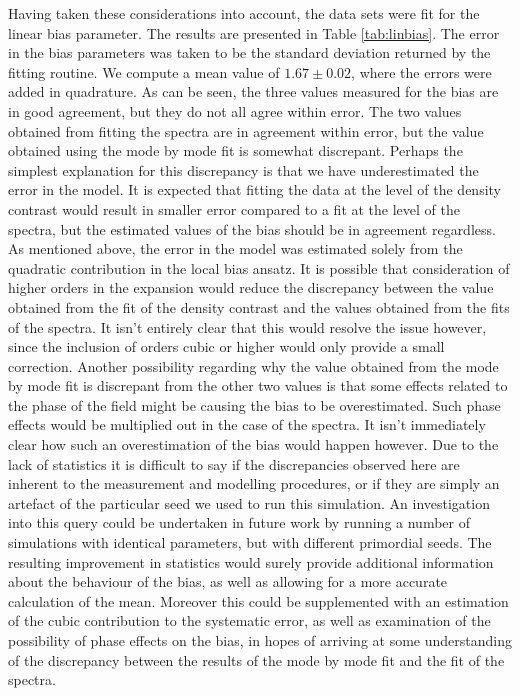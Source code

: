 \documentclass[10pt,letterpaper,final]{iopart}
\numberwithin{equation}{subsection}
\begin{document}
Having taken these considerations into account, the data sets were fit for the linear bias parameter. The results are presented in Table \ref{tab:linbias}. The error in the bias parameters was taken to be the standard deviation returned by the fitting routine.  We compute a mean value of $1.67 \pm 0.02$, where the errors were added in quadrature. As can be seen, the three values measured for the bias are in good agreement, but they do not all agree within error. The two values obtained from fitting the spectra are in agreement within error, but the value obtained using the mode by mode fit is somewhat discrepant. Perhaps the simplest explanation for this discrepancy is that we have underestimated the error in the model. It is expected that fitting the data at the level of the density contrast would result in smaller error compared to a fit at the level of the spectra, but the estimated values of the bias should be in agreement regardless. As mentioned above, the error in the model was estimated solely from the quadratic contribution in the local bias ansatz. It is possible that consideration of higher orders in the expansion would reduce the discrepancy between the value obtained from the fit of the density contrast and the values obtained from the fits of the spectra. It isn't entirely clear that this would resolve the issue however, since the inclusion of orders cubic or higher would only provide a small correction. Another possibility regarding why the value obtained from the mode by mode fit is discrepant from the other two values is that some effects related to the phase of the field might be causing the bias to be overestimated. Such phase effects would be multiplied out in the case of the spectra. It isn't immediately clear how such an overestimation of the bias would happen however.  Due to the lack of statistics it is difficult to say if the discrepancies observed here are inherent to the measurement and modelling procedures, or if they are simply an artefact of the particular seed we used to run this simulation. An investigation into this query could be undertaken in future work by running a number of simulations with identical parameters, but with different primordial seeds. The resulting improvement in statistics would surely provide additional information about the behaviour of the bias, as well as allowing for a more accurate calculation of the mean. Moreover this could be supplemented with an estimation of the cubic contribution to the systematic error, as well as examination of the possibility of phase effects on the bias, in hopes of arriving at some understanding of the discrepancy between the results of the mode by mode fit and the fit of the spectra. 
\end{document}

